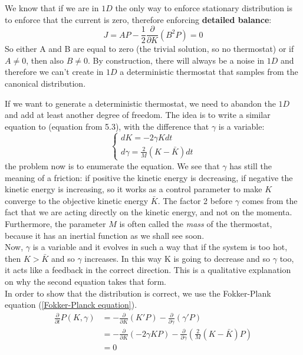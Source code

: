 We know that if we are in $1D$ the only way to enforce stationary distribution is to enforce that the current is zero, therefore enforcing \textbf{detailed balance}:
\begin{equation}
    J = AP - \frac{1}{2}\frac{\partial}{\partial K} (B^2 P) = 0
\end{equation}
So either A and B are equal to zero (the trivial solution, so no thermostat) or if $A\neq 0$, then also $B\neq 0$. By construction, there will always be a noise in $1D$ and therefore we can't  create in $1D$ a deterministic thermostat that samples from the canonical distribution.\\

\par If we want to generate a deterministic thermostat, we need to abandon the $1D$ and add at least another degree of freedom. The idea is to write a similar equation to (equation from 5.3), with the difference that $\gamma$ is a variable:
\begin{equation}
\begin{cases}
dK = -2 \gamma K dt \\
d\gamma = \frac{2}{M} (K - \bar{K}) dt
\end{cases}    
\end{equation}
 the problem now is to enumerate the equation. 
We see that $\gamma$ has still the meaning of a friction: if positive the kinetic energy is decreasing, if negative the kinetic energy is increasing, so it works as a control parameter to make $K$ converge to the objective kinetic energy $\bar{K}$. The factor 2 before $\gamma$ comes from the fact that we are acting directly on the kinetic energy, and not on the momenta. Furthermore, the parameter $M$ is often called the \textit{mass} of the thermostat, because it has an inertial function as we shall see soon.\\

Now, $\gamma $ is a variable and it evolves in such a way that if the system is too hot, then $K>\bar K$ and so $\gamma$ increases. In this way K is going to decrease and so $\gamma$ too, it acts like a feedback in the correct direction. This is a qualitative explanation on why the second equation takes that form.\\

In order to show that the distribution is correct, we use the Fokker-Plank equation (\ref{Fokker-Planck equation}). 
\begin{align*}
    \frac{\partial}{\partial t}P(K,\gamma ) &= - \frac{\partial}{\partial K}\left(K'P\right) - \frac{\partial}{\partial \gamma}\left(\gamma 'P\right)\\
    &= - \frac{\partial}{\partial K}\left(-2\gamma KP\right) - \frac{\partial}{\partial \gamma}\left(\frac{2}{M}(K-\bar K)P\right)\\
    &= 0\\ 
\end{align*}

